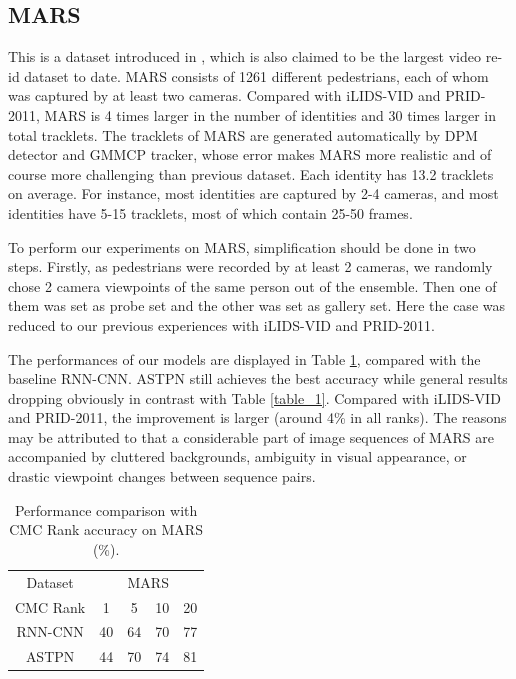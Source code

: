 \documentclass[10pt,twocolumn,letterpaper]{article}
\begin{document}
   
   
\subsection{MARS}
This is a dataset introduced in \cite{MARS}, which is also claimed to be the largest video re-id dataset to date. MARS consists of 1261 different pedestrians, each of whom was captured by at least two cameras.
Compared with iLIDS-VID and PRID-2011, MARS is 4 times larger in the number of identities and 30 times larger in total tracklets. The tracklets of MARS are generated automatically by DPM detector and GMMCP tracker, whose error makes MARS more realistic and of course more challenging than previous dataset. Each identity has 13.2 tracklets on average. For instance, most identities are captured by 2-4 cameras, and most identities have 5-15 tracklets, most of which contain 25-50 frames.

To perform our experiments on MARS, simplification should be done in two steps. Firstly, as pedestrians were recorded by at least 2 cameras, we randomly chose 2 camera viewpoints of the same person out of the ensemble. Then one of them was set as probe set and the other was set as gallery set. Here the case was reduced to our previous experiences with iLIDS-VID and PRID-2011. 
 
The performances of our models are displayed in Table \ref{table_MARS}, compared with the baseline RNN-CNN. 
ASTPN still achieves the best accuracy while general results dropping obviously in contrast with Table \ref{table_1}. Compared with iLIDS-VID and PRID-2011, the improvement is larger (around 4\% in all ranks). The reasons may be attributed to that a considerable part of image sequences of MARS are accompanied by cluttered backgrounds, ambiguity in visual appearance, or drastic viewpoint changes between sequence pairs.
 
 \begin{table}[tp]
 \small
 \renewcommand{\arraystretch}{1.3}
 \caption{Performance comparison with CMC Rank accuracy on MARS (\%). }
 \label{table_MARS}
 \centering
 \begin{tabular}{|c|c|c|c|c|}
 \hline
 Dataset &\multicolumn{4}{c|}{MARS}\\ \cline{1-5} 
 
 CMC Rank& 1 & 5 & 10 & 20\\
 \hline
 \hline
 RNN-CNN &       40  & 64   &  70 &  77     \\
 \hline
 ASTPN &         44   &  70  & 74   &   81    \\
 \hline
 
 \end{tabular}           
 
 
 \end{table}
\end{document}
